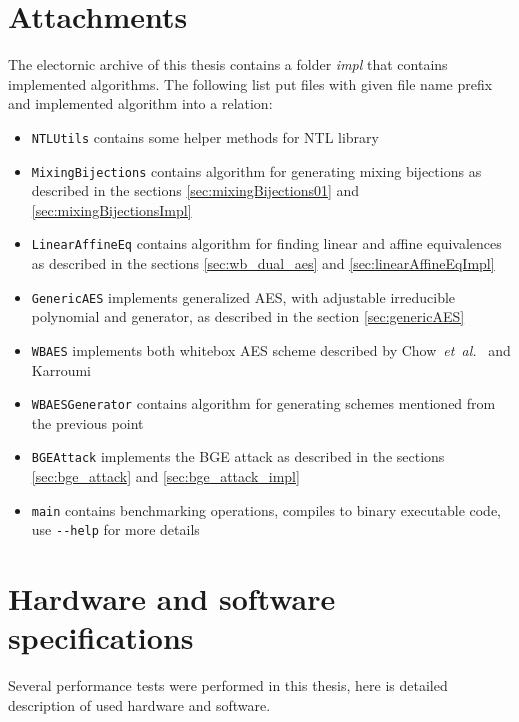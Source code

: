 \documentclass[11pt,oneside,final]{fithesis2}
\newcommand{\eal}{\emph{et~al.}}
\begin{document}
    \section{Attachments}\label{appendix:attach}
    The electornic archive of this thesis contains a folder \emph{impl} that contains implemented algorithms. 
    The following list put files with given file name prefix and implemented algorithm into a relation:
    \begin{itemize}
     \item \verb+NTLUtils+ contains some helper methods for NTL library
     \item \verb+MixingBijections+ contains algorithm for generating mixing bijections as described in the sections \ref{sec:mixingBijections01} and \ref{sec:mixingBijectionsImpl}
     \item \verb+LinearAffineEq+ contains algorithm for finding linear and affine equivalences as described in the sections \ref{sec:wb_dual_aes} and \ref{sec:linearAffineEqImpl}
     \item \verb+GenericAES+ implements generalized AES, with adjustable irreducible polynomial and generator, as described in the section \ref{sec:genericAES}
     \item \verb+WBAES+ implements both whitebox AES scheme described by Chow~\eal~\citep{Chow02white-boxcryptography} and Karroumi~\citep{Karroumi:2010:PWA:2041036.2041060}
     \item \verb+WBAESGenerator+ contains algorithm for generating schemes mentioned from the previous point
     \item \verb+BGEAttack+ implements the BGE attack as described in the sections \ref{sec:bge_attack} and \ref{sec:bge_attack_impl}
     \item \verb+main+ contains benchmarking operations, compiles to binary executable code, use \verb+--help+ for more details
    \end{itemize}
    
    \section{Hardware and software specifications}\label{appendix:hw_spec}
    Several performance tests were performed in this thesis, here is detailed description of used hardware and software.
    
\end{document}
